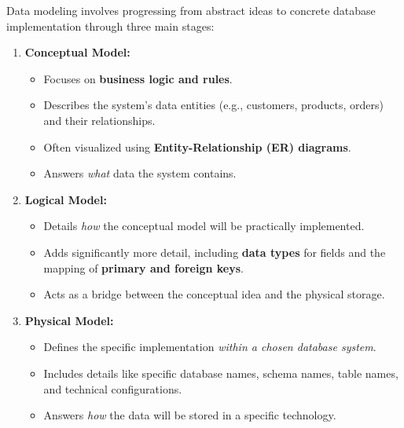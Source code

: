 Data modeling involves progressing from abstract ideas to concrete
database implementation through three main stages:
\begin{enumerate}
    \item \textbf{Conceptual Model:}
    \begin{itemize}
        \item Focuses on \textbf{business logic and rules}.
        \item Describes the system's data entities (e.g., customers,
        products, orders) and their relationships.
        \item Often visualized using \textbf{Entity-Relationship
        (ER) diagrams}.
        \item Answers \textit{what} data the system contains.
    \end{itemize}

    \item \textbf{Logical Model:}
    \begin{itemize}
        \item Details \textit{how} the conceptual model will be
        practically implemented.
        \item Adds significantly more detail, including
        \textbf{data types} for fields and the mapping of
        \textbf{primary and foreign keys}.
        \item Acts as a bridge between the conceptual idea and
        the physical storage.
    \end{itemize}

    \item \textbf{Physical Model:}
    \begin{itemize}
        \item Defines the specific implementation
        \textit{within a chosen database system}.
        \item Includes details like specific database names,
        schema names, table names, and technical
        configurations.
        \item Answers \textit{how} the data will be stored in a
        specific technology.
    \end{itemize}
\end{enumerate}


